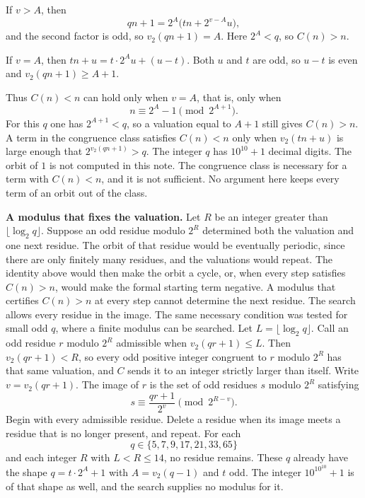 \documentclass[11pt]{article}
\newcommand{\topic}[1]{\par\noindent\textbf{#1}}
\begin{document}
If \(v > A\), then
\[
qn + 1 = 2^A \bigl(t n + 2^{v-A} u\bigr),
\]
and the second factor is odd, so \(v_2(qn+1) = A\).
Here \(2^A < q\), so \(C(n) > n\).

If \(v = A\), then \(tn + u = t \cdot 2^A u + (u - t)\).
Both \(u\) and \(t\) are odd, so \(u - t\) is even and \(v_2(qn+1) \ge A + 1\).

Thus \(C(n) < n\) can hold only when \(v = A\), that is, only when
\[
n \equiv 2^A - 1 \pmod{2^{A+1}}.
\]
For this \(q\) one has \(2^{A+1} < q\), so a valuation equal to \(A + 1\) still gives \(C(n) > n\).
A term in the congruence class satisfies \(C(n) < n\) only when \(v_2(tn + u)\) is large enough that \(2^{v_2(qn+1)} > q\).
The integer \(q\) has \(10^{10} + 1\) decimal digits.
The orbit of \(1\) is not computed in this note.
The congruence class is necessary for a term with \(C(n) < n\), and it is not sufficient.
No argument here keeps every term of an orbit out of the class.

\topic{A modulus that fixes the valuation.}
Let \(R\) be an integer greater than \(\lfloor \log_2 q \rfloor\).
Suppose an odd residue modulo \(2^R\) determined both the valuation and one next residue.
The orbit of that residue would be eventually periodic, since there are only finitely many residues, and the valuations would repeat.
The identity above would then make the orbit a cycle, or, when every step satisfies \(C(n) > n\), would make the formal starting term negative.
A modulus that certifies \(C(n) > n\) at every step cannot determine the next residue.
The search allows every residue in the image.
The same necessary condition was tested for small odd \(q\), where a finite modulus can be searched.
Let \(L = \lfloor \log_2 q \rfloor\).
Call an odd residue \(r\) modulo \(2^R\) admissible when \(v_2(qr + 1) \le L\).
Then \(v_2(qr + 1) < R\), so every odd positive integer congruent to \(r\) modulo \(2^R\) has that same valuation, and \(C\) sends it to an integer strictly larger than itself.
Write \(v = v_2(qr + 1)\).
The image of \(r\) is the set of odd residues \(s\) modulo \(2^R\) satisfying
\[
s \equiv \frac{qr + 1}{2^v} \pmod{2^{R-v}}.
\]
Begin with every admissible residue.
Delete a residue when its image meets a residue that is no longer present, and repeat.
For each
\[
q \in \{5, 7, 9, 17, 21, 33, 65\}
\]
and each integer \(R\) with \(L < R \le 14\), no residue remains.
These \(q\) already have the shape \(q = t \cdot 2^A + 1\) with \(A = v_2(q-1)\) and \(t\) odd.
The integer \(10^{10^{10}} + 1\) is of that shape as well, and the search supplies no modulus for it.
\end{document}
